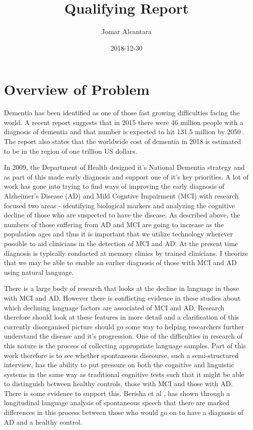 \documentclass{article}
\title{Qualifying Report}
\date{2018-12-30}
\author{Jomar Alcantara}
\begin{document}
\maketitle
\newpage
\tableofcontents
\newpage
\section{Overview of Problem}
Dementia has been identified as one of those fast growing difficulties facing the world. A recent report suggests that in 2015 there were 46 million people with a diagnosis of dementia and that number is expected to hit 131.5 million by 2050 \cite{Prince2015}. The report also states that the worldwide cost of dementia in 2018 is estimated to be in the region of one trillion US dollars.
\par
In 2009, the Department of Health designed it's National Dementia strategy and as part of this made early diagnosis and support one of it's key priorities. A lot of work has gone into trying to find ways of improving the early diagnosis of Alzheimer's Disease (AD) and Mild Cogntive Impairment (MCI) with research focused two areas - identifying biological markers and analyzing the cognitive decline of those who are suspected to have the disease. As described above, the numbers of those suffering from AD and MCI are going to increase as the population ages and thus it is important that we utilize technology wherever possible to aid clinicians in the detection of MCI and AD. At the present time diagnosis is typically conducted at memory clinics by trained clinicians. I theorize that we may be able to enable an earlier diagnosis of those with MCI and AD using natural language.
\par
There is a large body of research that looks at the decline in language in those with MCI and AD. However there is conflicting evidence in these studies about which declining language factors are associated of MCI and AD. Research therefore should look at these features in more detail and a clarification of this currently disorganised picture should go some way to helping researchers further understand the disease and it's progression. One of the difficulties in research of this nature is the process of collecting appropriate language samples. Part of this work therefore is to see whether spontaneous discourse, such a semi-structured interview, has the ability to put pressure on both the cognitive and linguistic systems in the same way as traditional cognitive tests such that it might be able to distinguish between healthy controls, those with MCI and those with AD. There is some evidence to support this. Berisha et al \cite{Berisha2015}, has shown through a longitudinal language analysis of spontaneous speech that there are marked differences in this process between those who would go on to have a diagnosis of AD and a healthy control. 
\end{document}
